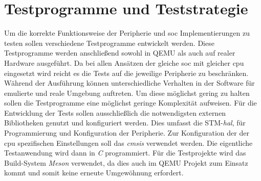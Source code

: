 \section{Testprogramme und Teststrategie}

Um die korrekte Funktionsweise der Peripherie und \ac{soc} Implementierungen zu
testen sollen verschiedene Testprogramme entwickelt werden.
Diese Testprogramme werden anschließend sowohl in QEMU als auch auf realer
Hardware ausgeführt.
Da bei allen Ansätzen der gleiche \ac{soc} mit gleicher \ac{cpu} eingesetzt
wird reicht es die Tests auf die jeweilige Peripherie zu beschränken.
Während der Ausführung können unterschiedliche Verhalten in der Software für
emulierte und reale Umgebung auftreten.
Um diese möglichst gering zu halten sollen die Testprogramme eine möglichst
geringe Komplexität aufweisen.
\newline
Für die Entwicklung der Tests sollen ausschließlich die notwendigsten externen
Bibliotheken genutzt und konfiguriert werden.
Dies umfasst die STM-\textit{\ac{hal}}, für Programmierung und Konfiguration
der Peripherie.
Zur Konfiguration der der \ac{cpu} spezifischen
Einstellungen soll das \textit{\ac{cmsis}} verwendet werden.
Die eigentliche Testanwendung wird dann in \textit{C} programmiert.
Für die Testprojekte wird das Build-System \textit{Meson} verwendet, da dies
auch im QEMU Projekt zum Einsatz kommt und somit keine erneute Umgewöhnung
erfordert.
